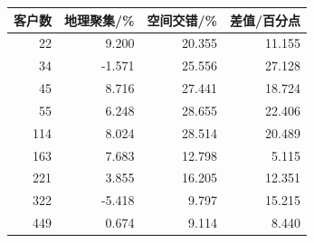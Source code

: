 \begin{tabular}{rrrr}
\toprule
客户数 & 地理聚集/\% & 空间交错/\% & 差值/百分点 \\
\midrule
22 & 9.200 & 20.355 & 11.155 \\
34 & -1.571 & 25.556 & 27.128 \\
45 & 8.716 & 27.441 & 18.724 \\
55 & 6.248 & 28.655 & 22.406 \\
114 & 8.024 & 28.514 & 20.489 \\
163 & 7.683 & 12.798 & 5.115 \\
221 & 3.855 & 16.205 & 12.351 \\
322 & -5.418 & 9.797 & 15.215 \\
449 & 0.674 & 9.114 & 8.440 \\
\bottomrule
\end{tabular}
